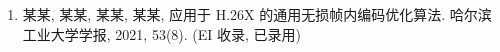 \begin{publications}
    \begin{enumerate}
        \item 某某, 某某, 某某, 某某,
              应用于 H.26X 的通用无损帧内编码优化算法.
              哈尔滨工业大学学报, 2021, 53(8). (EI 收录, 已录用)

    \end{enumerate}

\end{publications}